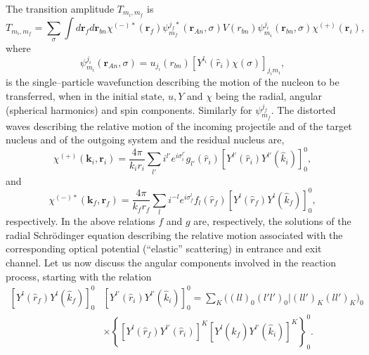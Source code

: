 The transition amplitude $T_{m_i,m_f}$ is
\begin{equation}\label{eq_onept5}
T_{m_i,m_f}=\sum_\sigma\int d\mathbf{r}_fd\mathbf{r}_{bn}\chi^{(-)*}(\mathbf{r}_f)
\psi_{m_f}^{j_f*}(\mathbf{r}_{An},\sigma)V(r_{bn})\psi_{m_i}^{j_i}(\mathbf{r}_{bn},\sigma)\chi^{(+)}(\mathbf{r}_i),
\end{equation}
where 
\begin{equation}\label{eq_onept12}
\psi_{m_i}^{j_i}(\mathbf{r}_{An},\sigma)=u_{j_i}(r_{bn})\left[ Y^{l_i} (\hat r_i)\chi(\sigma)\right]_{j_i m_i},
\end{equation}
is the single--particle wavefunction describing the motion of the nucleon  to be transferred, when in the initial state, $u,Y$ and $\chi$ being the radial, angular (spherical harmonics) and spin components. Similarly for $\psi_{m_f}^{j_f}$. 
The distorted waves describing the relative motion of the incoming projectile and of the target nucleus and of the outgoing system and the residual nucleus are,
 \begin{equation}\label{eq_onept6}
\chi^{(+)}(\mathbf{k}_i,\mathbf{r}_i)= \frac{ 4\pi }{k_i r_i}\sum_{l'} i^{l'}
e^{i\sigma_i^{l'}} g_{l'}(\hat r_i) \left[ Y^{l'} (\hat r_i) Y^{l'} (\hat k_i)\right]^0_0,
\end{equation}
and
 \begin{equation}\label{eq_onept7}
\chi^{(-)*}(\mathbf{k}_f,\mathbf{r}_f)= \frac{ 4\pi }{k_f r_f}\sum_{l} i^{-l}
e^{i\sigma_f^{l}} f_{l}  (\hat r_f) \left[ Y^{l} (\hat r_f) Y^{l} (\hat k_f)\right]^0_0,
\end{equation}
respectively. In the above relations $f$ and $g$ are, respectively, the solutions of the radial Schr\"odinger equation  describing the relative motion  associated with the corresponding optical potential  (``elastic'' scattering) in entrance and exit channel. Let us now discuss the angular components involved in the reaction process, starting with the relation 
\begin{equation}\label{eq_onept8}
    \begin{split}
\left[ Y^{l} (\hat r_f) Y^{l} (\hat k_f)\right]^0_0&\left[ Y^{l'} (\hat r_i) Y^{l'} (\hat k_i)\right]^0_0=\sum_K \bigl((l l)_0(l' l')_0|(l l')_K(l l')_K\bigr)_0\\
&\times \left\{\left[ Y^{l} (\hat r_f) Y^{l'} (\hat r_i)\right]^K\left[ Y^{l} (\hat k_f) Y^{l'} (\hat k_i)\right]^K\right\}^0_0.
    \end{split}
\end{equation}
